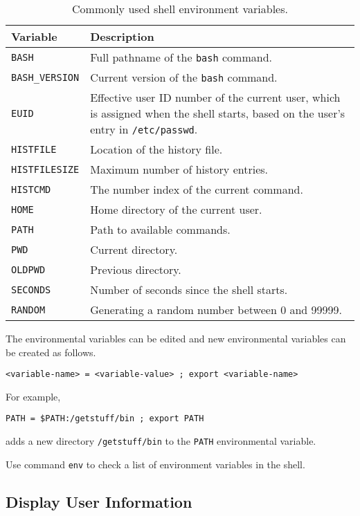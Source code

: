 \begin{table}
	\centering \caption{Commonly used shell environment variables.}\label{ch:sb:tab:shellenvironmentvars}
	\begin{tabularx}{\textwidth}{lX}
		\hline
		Variable & Description \\ \hline
		\verb|BASH| & Full pathname of the \verb|bash| command. \\ \hdashline
		\verb|BASH_VERSION| & Current version of the \verb|bash| command. \\ \hdashline
		\verb|EUID| & Effective user ID number of the current user, which is assigned when the shell starts, based on the user's entry in \verb|/etc/passwd|. \\ \hdashline
		\verb|HISTFILE| & Location of the history file. \\ \hdashline
		\verb|HISTFILESIZE| & Maximum number of history entries. \\ \hdashline
		\verb|HISTCMD| & The number index of the current command. \\ \hdashline
		\verb|HOME| & Home directory of the current user. \\ \hdashline
		\verb|PATH| & Path to available commands. \\ \hdashline
		\verb|PWD| & Current directory. \\ \hdashline
		\verb|OLDPWD| & Previous directory. \\ \hdashline
		\verb|SECONDS| & Number of seconds since the shell starts. \\ \hdashline
		\verb|RANDOM| & Generating a random number between 0 and 99999. \\
		\hline
	\end{tabularx}
\end{table}

The environmental variables can be edited and new environmental variables can be created as follows.
\begin{lstlisting}
<variable-name> = <variable-value> ; export <variable-name>
\end{lstlisting}

For example,
\begin{lstlisting}
PATH = $PATH:/getstuff/bin ; export PATH
\end{lstlisting}
adds a new directory \verb|/getstuff/bin| to the \verb|PATH| environmental variable.

Use command \verb|env| to check a list of environment variables in the shell.

\subsection{Display User Information}

